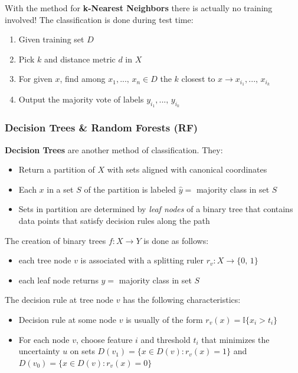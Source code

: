 \documentclass[a4paper]{extarticle}
\begin{document}
With the method for \textbf{k-Nearest Neighbors} there is actually no training involved! The classification is done during test time:

\begin{enumerate}
    \item Given training set $D$
    \item Pick $k$ and distance metric $d$ in $X$
    \item For given $x$, find among $x_1,..., \, x_n \in D$ the $k$ closest to $x \to x_{i_1},..., \, x_{i_k}$
    \item Output the majority vote of labels $y_{i_1},..., \, y_{i_k}$
\end{enumerate}

\subsubsection{Decision Trees \& Random Forests (RF)}

\textbf{Decision Trees} are another method of classification. They:

\begin{itemize}
    \item Return a partition of $X$ with sets aligned with canonical coordinates
    \item Each $x$ in a set $S$ of the partition is labeled $\hat{y} =$ majority class in set $S$
    \item Sets in partition are determined by \textit{leaf nodes} of a binary tree that contains data points that satisfy decision rules along the path
\end{itemize}

The creation of binary trees $f : X \to Y$ is done as follows:

\begin{itemize}
    \item each tree node $v$ is associated with a splitting ruler $r_v : X \to \{0, \, 1\}$
    \item each leaf node returns $\hat{y} =$ majority class in set $S$
\end{itemize}

The decision rule at tree node $v$ has the following characteristics:

\begin{itemize}
    \item Decision rule at some node $v$ is usually of the form $r_v(x) = \mathbb{I}\{x_i > t_i\}$
    \item For each node $v$, choose feature $i$ and threshold $t_i$ that minimizes the uncertainty $u$ on sets $D(v_1) = \{x \in D(v) : r_v(x) = 1\}$ and $D(v_0) = \{x \in D(v) : r_v(x) = 0\}$
\end{itemize}
\end{document}
